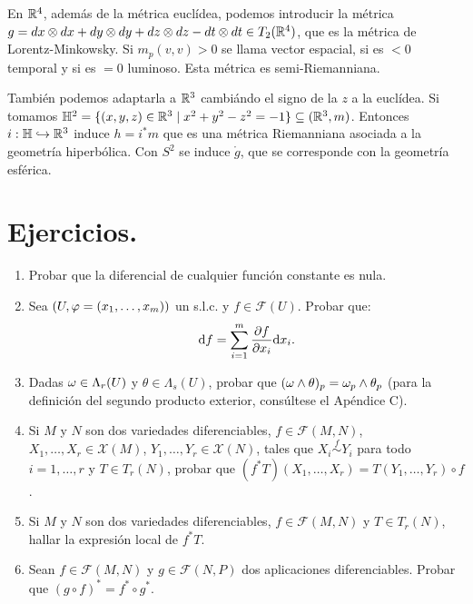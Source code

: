 \documentclass[cursovd_portada.tex]{subfiles}
\begin{document}
\begin{nota}
En $\mathbb{R}^4$, además de la métrica euclídea, podemos introducir la métrica $g=dx\otimes dx + dy\otimes dy + dz\otimes dz-dt\otimes dt \in T_2(\mathbb{R}^4)$, que es la métrica de Lorentz-Minkowsky. Si $m_p(v,v)>0$ se llama vector espacial, si es $<0$ temporal y si es $=0$ luminoso. Esta métrica es semi-Riemanniana.

También podemos adaptarla a $\mathbb{R}^3$ cambiándo el signo de la $z$ a la euclídea. Si tomamos $\mathbb{H}^2=\{(x,y,z)\in\mathbb{R}^3\mid x^2+y^2-z^2=-1\}\subseteq (\mathbb{R}^3,m)$. Entonces $i:\mathbb{H}\hookrightarrow\mathbb{R}^3$ induce $h=i^*m$ que es una métrica Riemanniana asociada a la geometría hiperbólica. Con $S^2$ se induce $ \mathring{g}$, que se corresponde con la geometría esférica. 
\end{nota}

\newpage

\section{Ejercicios.}
\begin{enumerate}
\item Probar que la diferencial de cualquier función constante
es nula. \item Sea $(U,\varphi=(x_1,\dots, x_m))$ un s.l.c. y
$f\in\mathcal{F}(U)$. Probar que:
$${\rm d} f=\sum_{i=1}^m\displaystyle{\frac{\partial f}{\partial x_i}}{\rm d} x_i.$$
\item Dadas $\omega\in\Lambda_r(U)$ y $\theta\in\Lambda_s(U)$, probar
que $(\omega\wedge\theta)_p=\omega_p\wedge\theta_p$ (para la
definición del segundo producto exterior, consúltese el
Apéndice C). \item Si $M$ y $N$ son dos variedades
diferenciables, $f\in\mathcal{F}(M,N)$, $X_1,\dots
,X_r\in\mathcal{X}(M)$, $Y_1,\dots ,Y_r\in\mathcal{X}(N)$, tales
que $X_i\stackrel{f}\sim Y_i$ para todo $i=1,\dots ,r$ y $T\in
T_r(N)$, probar que $(f^*T)(X_1,\dots ,X_r)=T(Y_1,\dots ,Y_r)\circ
f$. \item Si $M$ y $N$ son dos variedades diferenciables,
$f\in\mathcal{F}(M,N)$ y $T\in T_r(N)$, hallar la expresión
local de $f^*T$. \item Sean $f\in\mathcal{F}(M,N)$ y
$g\in\mathcal{F}(N,P)$ dos aplicaciones diferenciables. Probar que
$(g\circ f)^*=f^*\circ g^*$.
\end{enumerate}
\end{document}

